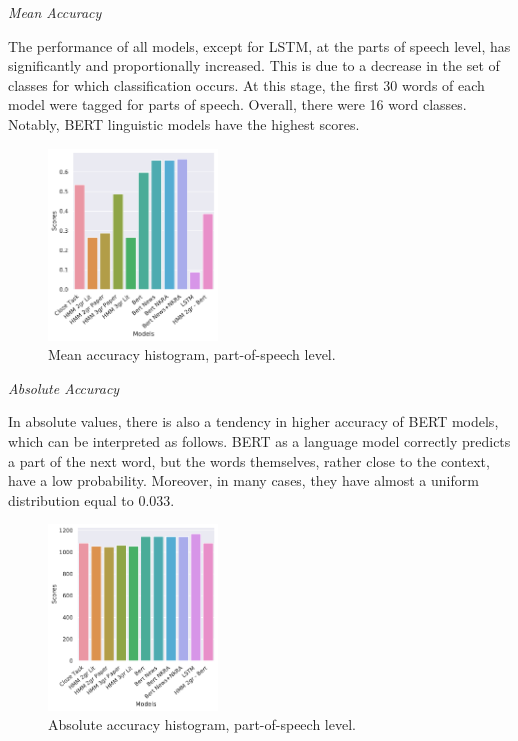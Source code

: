 \documentclass[a4paper]{article}
\newcommand{\head}[1]{\vspace{0.5em}\emph{#1}\vspace{0.25em}}
\begin{document}
\head{Mean Accuracy}

The performance of all models, except for LSTM, at the parts of speech level, has significantly and proportionally increased. This is due to a decrease in the set of classes for which classification occurs. At this stage, the first 30 words of each model were tagged for parts of speech. Overall, there were 16 word classes. Notably, BERT linguistic models have the highest scores.

\begin{figure}
\caption{Mean accuracy histogram, part-of-speech level.}
\label{fig:mean-accuracy-hist-pos}
\centering
\includegraphics[width=0.4\textwidth]{figures/pdf/mean-accuracy-hist-pos.pdf}
\end{figure}

\head{Absolute Accuracy}

In absolute values, there is also a tendency in higher accuracy of BERT models, which can be interpreted as follows. BERT as a language model correctly predicts a part of the next word, but the words themselves, rather close to the context, have a low probability. Moreover, in many cases, they have almost a uniform distribution equal to 0.033.

\begin{figure}
\caption{Absolute accuracy histogram, part-of-speech level.}
\label{fig:abs-accuracy-hist-pos}
\centering
\includegraphics[width=0.4\textwidth]{figures/pdf/abs-accuracy-hist-pos.pdf}
\end{figure}
\end{document}
